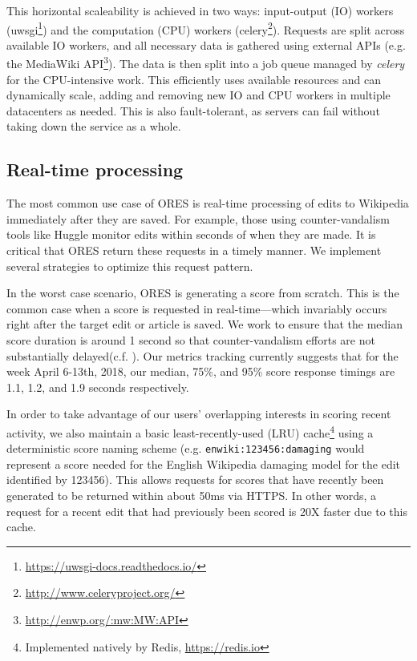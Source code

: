 This horizontal scaleability is achieved in two ways: input-output (IO) workers (uwsgi\footnote{\url{https://uwsgi-docs.readthedocs.io/}}) and the computation (CPU) workers (celery\footnote{\url{http://www.celeryproject.org/}}).  Requests are split across available IO workers, and all necessary data is gathered using external APIs (e.g. the MediaWiki API\footnote{\url{http://enwp.org/:mw:MW:API}}).  The data is then split into a job queue managed by \emph{celery} for the CPU-intensive work.  This efficiently uses available resources and can dynamically scale, adding and removing new IO and CPU workers in multiple datacenters as needed.  This is also fault-tolerant, as servers can fail without taking down the service as a whole.

\subsection{Real-time processing}
The most common use case of ORES is real-time processing of edits to Wikipedia immediately after they are saved.  For example, those using counter-vandalism tools like Huggle monitor edits within seconds of when they are made.  It is critical that ORES return these requests in a timely manner.  We implement several strategies to optimize this request pattern.

In the worst case scenario, ORES is generating a score from scratch.  This is the common case when a score is requested in real-time---which invariably occurs right after the target edit or article is saved.  We work to ensure that the median score duration is around 1 second so that counter-vandalism efforts are not substantially delayed(c.f. \cite{geiger13levee}).  Our metrics tracking currently suggests that for the week April 6-13th, 2018, our median, 75\%, and 95\% score response timings are 1.1, 1.2, and 1.9 seconds respectively.

In order to take advantage of our users' overlapping interests in scoring recent activity, we also maintain a basic least-recently-used (LRU) cache\footnote{Implemented natively by Redis, \url{https://redis.io}} using a deterministic score naming scheme (e.g. \texttt{enwiki:123456:damaging} would represent a score needed for the English Wikipedia damaging model for the edit identified by 123456).  This allows requests for scores that have recently been generated to be returned within about 50ms via HTTPS.  In other words, a request for a recent edit that had previously been scored is 20X faster due to this cache.

